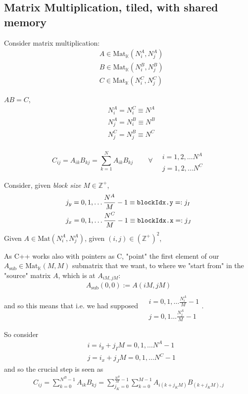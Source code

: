 \documentclass[10pt]{amsart}
\begin{document}
\begin{multicols*}{2}
\section{Matrix Multiplication, tiled, with shared memory}

Consider matrix multiplication:  
\[
\begin{aligned}
	& A \in \text{Mat}_{\mathbb{K}}(N_i^A, N_j^A)  \\ 
	& B \in \text{Mat}_{\mathbb{K}}(N_i^B, N_j^B)  \\
	& C \in \text{Mat}_{\mathbb{K}}(N_i^C, N_j^C)  
\end{aligned}
\]

$AB=C$, 
\[
\begin{aligned}
	& N_i^A = N_i^C \equiv N^A \\ 
	& N_j^A = N_i^B \equiv N^B \\ 
	& N_j^C = N_j^B \equiv N^C 
\end{aligned}
\]

\[
C_{ij} = A_{ik}B_{kj} = \sum_{k=1}^N A_{ik} B_{kj} \qquad \, \forall \, \begin{aligned} & \quad \\ 
	& i=1,2,\dots N^A \\
	& j = 1,2,\dots N^C \end{aligned}
\]

Consider, given \emph{block size} $M\in \mathbb{Z}^+$, 
\[
\begin{aligned}
	& j_y = 0,1,\dots \frac{N^A}{M} - 1 \equiv \verb|blockIdx.y| =: j_I \\
	& j_x = 0,1,\dots \frac{N^C}{M} -1 \equiv \verb|blockIdx.x| =: j_J 
\end{aligned}
\]
Given $A \in \text{Mat}(N_i^A, N_j^A)$, given $(i,j) \in (\mathbb{Z}^+)^2$, 

As C++ works also with pointers as C, "point" the first element of our $A_{\text{sub}} \in \text{Mat}_{\mathbb{K}}(M,M)$ submatrix that we want, to where we "start from" in the "source" matrix $A$, which is at $A_{iM,jM}$:
\[
\begin{gathered}
	A_{\text{sub}}(0,0):=A(iM,jM) 
\end{gathered}
\]
and so this means that i.e. we had supposed $\begin{aligned} & \quad \\
& i=0,1,\dots \frac{N_i^A}{M} - 1 \\
& j=0,1\dots \frac{N_j^A}{M}-1 \end{aligned}$.  

So consider 
\[
\begin{aligned}
	& i = i_y +j_IM = 0,1,\dots N^A -1 \\ 
	& j = i_x + j_JM = 0,1,\dots N^C - 1 
\end{aligned}
\]
and so the crucial step is seen as 
\[
\begin{gathered}
	C_{ij} = \sum_{k=0}^{N^B-1} A_{ik} B_{kj} = \sum_{j_K=0}^{\frac{N^B}{M}-1} \sum_{k=0}^{M-1} A_{i(k+j_KM)}B_{(k+j_KM), j}
\end{gathered}
\]


\end{multicols*}
\end{document}
